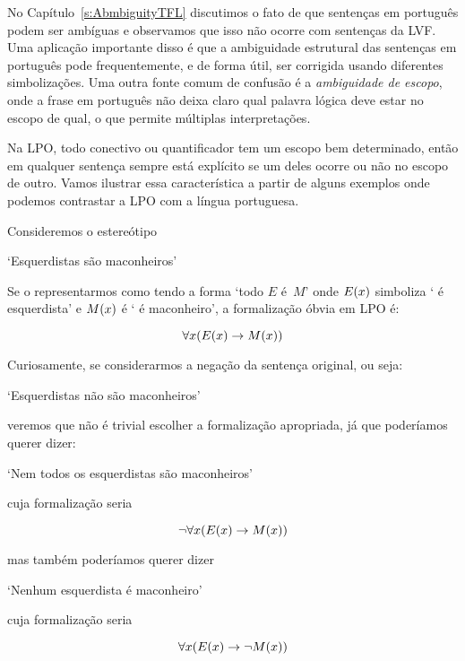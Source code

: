 No Capítulo~\ref{s:AbmbiguityTFL} discutimos o fato de que sentenças em português podem ser ambíguas e observamos que isso não ocorre com sentenças da LVF. Uma aplicação importante disso é que a ambiguidade estrutural das sentenças em português pode frequentemente, e de forma útil, ser corrigida usando diferentes simbolizações. Uma outra fonte comum de confusão é a \emph{ambiguidade de escopo}, onde a frase em português não deixa claro qual palavra lógica deve estar no escopo de qual, o que permite múltiplas interpretações.

Na LPO, todo conectivo ou quantificador tem um escopo bem determinado, então em qualquer sentença sempre está explícito se um deles ocorre ou não no escopo de outro. Vamos ilustrar essa característica a partir de alguns exemplos onde podemos contrastar a LPO com a língua portuguesa.

Consideremos o estereótipo

\begin{center}
`Esquerdistas são maconheiros'
\end{center}

Se o representarmos como tendo a forma `todo $E$ é~$M$' onde $\mathord{E}(x)$ simboliza ` é esquerdista' e $\mathord{M}(x)$ é ` é maconheiro', a formalização óbvia em LPO é:

$$\forall x (\mathord{E}(x) \rightarrow \mathord{M}(x))$$

Curiosamente, se considerarmos a negação da sentença original, ou seja:

\begin{center}
`Esquerdistas não são maconheiros'
\end{center}

veremos que não é trivial escolher a formalização apropriada, já que poderíamos querer dizer:

\begin{center}
 `Nem todos os esquerdistas são maconheiros'
\end{center}

cuja formalização seria

$$\neg \forall x (\mathord{E}(x) \rightarrow \mathord{M}(x))$$

mas também poderíamos querer dizer

\begin{center}
 `Nenhum esquerdista é maconheiro'
\end{center}

cuja formalização seria

$$\forall x (\mathord{E}(x) \rightarrow \neg \mathord{M}(x))$$

